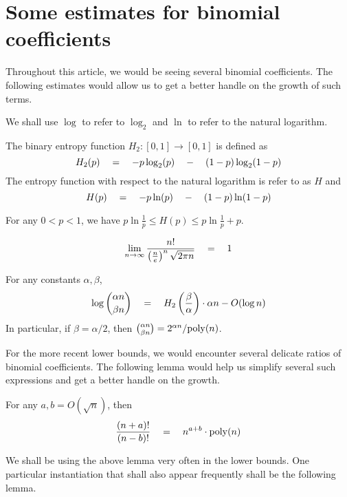 \chapter{Some estimates for binomial coefficients}

Throughout this article, we would be seeing several binomial coefficients.  
The following estimates would allow us to get a better handle on the growth of such terms. 

We shall use $\log$ to refer to $\log_2$ and $\ln$ to refer to the natural logarithm. 


\begin{definition}\label{def:entropy}
The binary entropy function $H_2:[0,1]\rightarrow [0,1]$ is defined as
\[
H_2(p) \quad = \quad - p \log_2(p) \quad - \quad (1-p) \log_2(1-p)
\]
The entropy function with respect to the natural logarithm is refer to as $H$ and
\[
H(p) \quad = \quad - p \ln(p) \quad - \quad (1-p) \ln(1-p)
\]
\end{definition}

\begin{proposition}\label{prop:entropy-estimate}
For any $0< p  < 1$, we have $p\ln\frac{1}{p} \leq H(p) \leq p\ln\frac{1}{p} + p$. 
\end{proposition}

\begin{proposition}\label{prop:sterling}
\[
\lim_{n\rightarrow \infty}\frac{n!}{\left(\frac{n}{e}\right)^n \sqrt{2\pi n}}  \quad=\quad 1
\]
\end{proposition}

\begin{proposition}
For any constants $\alpha, \beta$, 
\[
\log\binom{\alpha n}{\beta n} \quad = \quad H_2\left(\frac{\beta}{\alpha}\right) \cdot \alpha n - O(\log n)
\]
In particular, if $\beta = \alpha/2$, then $\binom{\alpha n}{\beta{n}} = 2^{\alpha n} / \mathrm{poly}(n)$. 
\end{proposition}

For the more recent lower bounds, we would encounter several delicate ratios of binomial coefficients. 
The following lemma would help us simplify several such expressions and get a better handle on the growth. 

\begin{lemma}{\cite[Lemma 6]{gkks13}}\label{lem:factorial-ratio} For any $a,b = O(\sqrt{n})$, then
\[
\frac{(n+a)!}{(n-b)!}\quad=\quad n^{a + b} \cdot \mathrm{poly}(n)
\]
\end{lemma}

We shall be using the above lemma very often in the lower bounds. 
One particular instantiation that shall also appear frequently shall be the following lemma.  


